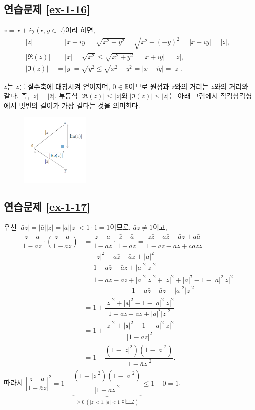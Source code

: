 \subsection*{연습문제 \ref{ex-1-16}}

$z = x+iy$ ($x,y\in\mathbb R$)이라 하면,
\begin{align*}
|z| &= |x+iy| = \sqrt{x^2+y^2} = \sqrt{x^2+(-y)^2} = |x-iy| = |\bar z|, \\
|\Re(z)| & =  |x| = \sqrt{x^2} \le  \sqrt{x^2+y^2} = |x+iy| = |z|, \\
|\Im(z)| &= |y| = \sqrt{y^2} \le  \sqrt{x^2+y^2} = |x+iy| = |z|.
\end{align*}

$\bar z$는 $z$를 실수축에 대칭시켜 얻어지며,
$0\in\mathbb R$이므로 원점과 $z$와의 거리는 $\bar z$와의 거리와 같다.
즉, $ |z| = |\bar z|$.
부등식 $|\Re(z)| \le|z|$와 $|\Im(z)|\le |z|$는 
아래 그림에서 직각삼각형에서 빗변의 길이가 가장 길다는 것을 의미한다.

\begin{figure}[h!]
\begin{center}
\includegraphics[width=0.3\textwidth]{./figs/fig-s-0-1}
\end{center}
\end{figure}

\subsection*{연습문제 \ref{ex-1-17}}

우선 $|\bar az| = |\bar a||z| = |a||z| <1\cdot 1 =1$이므로, $\bar az \ne 1$이고,
\begin{align*}
\dfrac{z-a}{1-\bar az}\cdot \overline{\left(\dfrac{z-a}{1-\bar az}\right)}
&= \dfrac{z-a}{1-\bar az}\cdot \dfrac{\bar z-\bar a}{1-a\bar z}
= \dfrac{z\bar z - a\bar z - \bar a z+a\bar a}{1-a\bar z - \bar a z + a\bar a z \bar z} \\
&= \dfrac{|z|^2 - a\bar z - \bar a z + |a|^2}{1-a\bar z - \bar a z + |a|^2|z|^2} \\
&= \dfrac{1 - a\bar z - \bar a z + |a|^2|z|^2+|z|^2+|a|^2-1-|a|^2|z|^2}
{1-a\bar z - \bar a z + |a|^2|z|^2} \\
&= 1 + \dfrac{|z|^2+|a|^2-1-|a|^2|z|^2}{1-a\bar z - \bar a z + |a|^2|z|^2} \\
&= 1 + \dfrac{|z|^2+|a|^2-1-|a|^2|z|^2}{|1- \bar a z|^2} \\
&= 1 -  \dfrac{(1-|z|^2)(1-|a|^2)}{|1- \bar a z|^2}.
\end{align*}
따라서
$\left| \dfrac{z-a}{1-\bar az} \right|^2 = 1 -
\underbrace{\dfrac{(1-|z|^2)(1-|a|^2)}{|1- \bar a z|^2}}_{\ge0\ (|z|<1, |a|<1\text{ 이므로})}
\le 1-0 = 1$.

